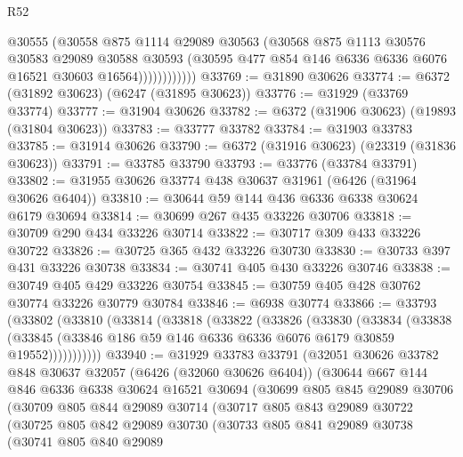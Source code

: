 \begin{lexlean}{R52}
\begin{coremodule}
                      @30555
                      (@30558
                        @875
                        @1114
                        @29089
                        @30563
                        (@30568
                          @875
                          @1113
                          @30576
                          @30583
                          @29089
                          @30588
                          @30593
                          (@30595 @477 @854 @146 @6336 @6336 @6076 @16521 @30603 @16564))))))))))))
@33769 := @31890 @30626
@33774 := @6372 (@31892 @30623) (@6247 (@31895 @30623))
@33776 := @31929 (@33769 @33774)
@33777 := @31904 @30626
@33782 := @6372 (@31906 @30623) (@19893 (@31804 @30623))
@33783 := @33777 @33782
@33784 := @31903 @33783
@33785 := @31914 @30626
@33790 := @6372 (@31916 @30623) (@23319 (@31836 @30623))
@33791 := @33785 @33790
@33793 := @33776 (@33784 @33791)
@33802 := @31955 @30626 @33774 @438 @30637 @31961 (@6426 (@31964 @30626 @6404))
@33810 := @30644 @59 @144 @436 @6336 @6338 @30624 @6179 @30694
@33814 := @30699 @267 @435 @33226 @30706
@33818 := @30709 @290 @434 @33226 @30714
@33822 := @30717 @309 @433 @33226 @30722
@33826 := @30725 @365 @432 @33226 @30730
@33830 := @30733 @397 @431 @33226 @30738
@33834 := @30741 @405 @430 @33226 @30746
@33838 := @30749 @405 @429 @33226 @30754
@33845 := @30759 @405 @428 @30762 @30774 @33226 @30779 @30784
@33846 := @6938 @30774
@33866 := @33793
    (@33802
      (@33810
        (@33814
          (@33818
            (@33822
              (@33826
                (@33830
                  (@33834
                    (@33838
                      (@33845 (@33846 @186 @59 @146 @6336 @6336 @6076 @6179 @30859 @19552)))))))))))
@33940 := @31929
    @33783
    @33791
    (@32051
      @30626
      @33782
      @848
      @30637
      @32057
      (@6426 (@32060 @30626 @6404))
      (@30644
        @667
        @144
        @846
        @6336
        @6338
        @30624
        @16521
        @30694
        (@30699
          @805
          @845
          @29089
          @30706
          (@30709
            @805
            @844
            @29089
            @30714
            (@30717
              @805
              @843
              @29089
              @30722
              (@30725
                @805
                @842
                @29089
                @30730
                (@30733
                  @805
                  @841
                  @29089
                  @30738
                  (@30741
                    @805
                    @840
                    @29089

\end{coremodule}
\end{lexlean}
